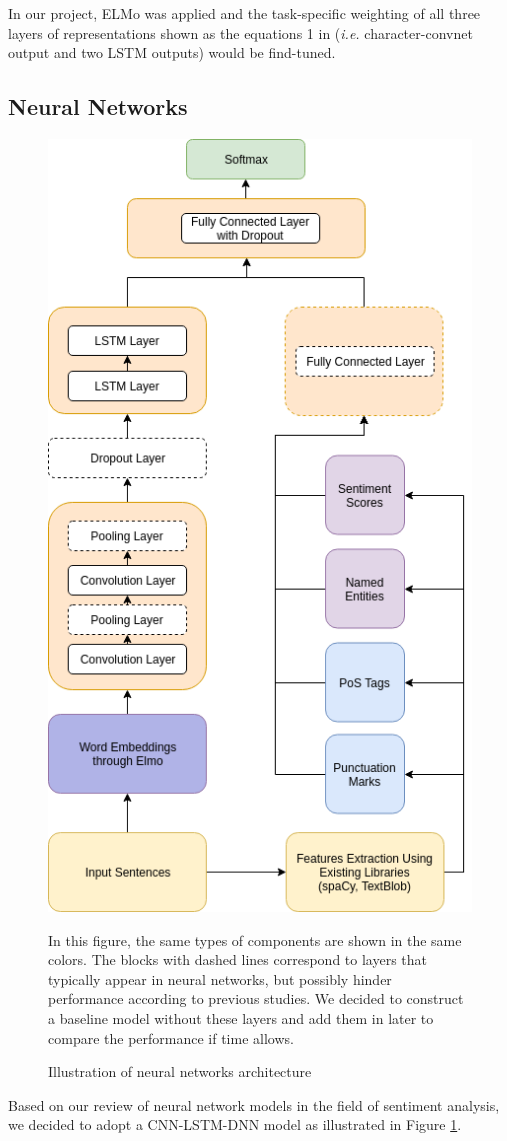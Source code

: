 \documentclass[12pt]{diazessay} %
\begin{document}
In our project, ELMo was applied and the task-specific weighting of all three layers of representations shown as the equations 1 in  \citet{peters2018deep} (\textit{i.e.} character-convnet output and two LSTM outputs) would be find-tuned.


\subsection{Neural Networks}
\begin{figure}[ht!]
	\includegraphics[height=0.7\textheight, center]{graphs/nn_architecture.png}
	\caption{Illustration of neural networks architecture}
	\medskip
	\small
	In this figure, the same types of components are shown in the same colors. The blocks with dashed lines correspond to layers that typically appear in neural networks, but possibly hinder performance according to previous studies. We decided to construct a baseline model without these layers and add them in later to compare the performance if time allows. 
	\label{figure:nnarchitecture}
\end{figure}
Based on our review of neural network models in the field of sentiment analysis, we decided to adopt a CNN-LSTM-DNN model as illustrated in Figure \ref{figure:nnarchitecture}. 
\end{document}
